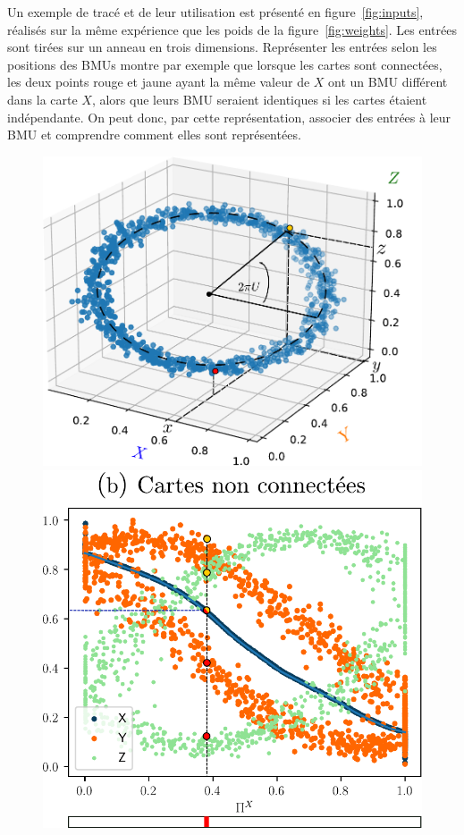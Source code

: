 Un exemple de tracé et de leur utilisation est présenté en figure~\ref{fig:inputs}, réalisés sur la même expérience que les poids de la figure~\ref{fig:weights}. Les entrées sont tirées sur un anneau en trois dimensions. Représenter les entrées selon les positions des BMUs montre par exemple que lorsque les cartes sont connectées, les deux points rouge et jaune ayant la même valeur de $X$ ont un BMU différent dans la carte $X$, alors que leurs BMU seraient identiques si les cartes étaient indépendante. On peut donc, par cette représentation, associer des entrées à leur BMU et comprendre comment elles sont représentées.

\begin{figure}
\begin{minipage}{0.34\textwidth}
\includegraphics[width=\textwidth]{inputs.pdf}
\end{minipage}
\begin{minipage}{0.3\textwidth}
\includegraphics[width=\textwidth]{maps_unconnected.pdf}

\end{minipage}
\end{figure}
